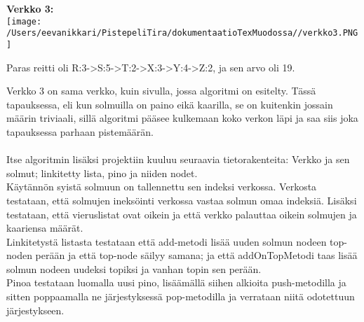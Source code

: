 \documentclass[12pt,a4paper,leqno]{amsart}
\begin{document}
\textbf{Verkko 3:}\\
\texttt{[image: /Users/eevanikkari/PistepeliTira/dokumentaatioTexMuodossa//verkko3.PNG]}

Paras reitti oli R:3->S:5->T:2->X:3->Y:4->Z:2, ja sen arvo oli 19.



Verkko 3 on sama verkko, kuin sivulla, jossa algoritmi on esitelty. Tässä tapauksessa, eli kun solmuilla on paino eikä kaarilla, se on kuitenkin jossain määrin triviaali, sillä algoritmi pääsee kulkemaan koko verkon läpi ja saa siis joka tapauksessa parhaan pistemäärän.
\\\\

Itse algoritmin lisäksi projektiin kuuluu seuraavia tietorakenteita: Verkko ja sen solmut; linkitetty lista, pino ja niiden nodet.\\

Käytännön syistä solmuun on tallennettu sen indeksi verkossa. Verkosta testataan, että solmujen ineksöinti verkossa vastaa solmun omaa indeksiä. Lisäksi testataan, että vieruslistat ovat oikein ja että verkko palauttaa oikein solmujen ja kaariensa määrät.\\

Linkitetystä listasta testataan että add-metodi lisää uuden solmun nodeen top-noden perään ja että top-node säilyy samana; ja että addOnTopMetodi taas lisää solmun nodeen uudeksi topiksi ja vanhan topin sen perään.\\

Pinoa testataan luomalla uusi pino, lisäämällä siihen alkioita push-metodilla ja sitten poppaamalla ne järjestyksessä pop-metodilla ja verrataan niitä odotettuun järjestykseen.
\end{document}
